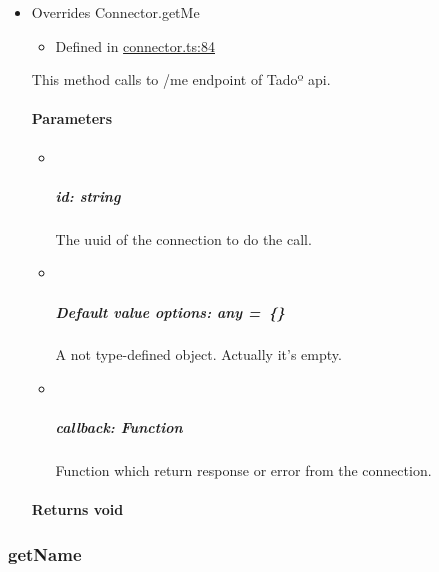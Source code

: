 \documentclass[]{article}
\providecommand{\tightlist}{%
  \setlength{\itemsep}{0pt}\setlength{\parskip}{0pt}}
\let\oldparagraph\paragraph
\renewcommand{\paragraph}[1]{\oldparagraph{#1}\mbox{}}
\let\oldsubparagraph\subparagraph
\renewcommand{\subparagraph}[1]{\oldsubparagraph{#1}\mbox{}}
\begin{document}
\begin{itemize}
\item
  Overrides Connector.getMe

  \begin{itemize}
  \tightlist
  \item
    Defined in
    \href{https://github.com/BFMBFramework/TadoConnector/blob/f05932b/src/connector.ts\#L84}{connector.ts:84}
  \end{itemize}

  This method calls to /me endpoint of Tadoº api.

  \hypertarget{parameters-5}{%
  \paragraph{Parameters}\label{parameters-5}}

  \begin{itemize}
  \item ~
    \hypertarget{id-string-2}{%
    \subparagraph{\texorpdfstring{id:
    {string}}{id: string}}\label{id-string-2}}

    The uuid of the connection to do the call.
  \item ~
    \hypertarget{default-value-options-any}{%
    \subparagraph{\texorpdfstring{{Default value} options: {any}{
    =~\{\}}}{Default value options: any =~\{\}}}\label{default-value-options-any}}

    A not type-defined object. Actually it's empty.
  \item ~
    \hypertarget{callback-function-3}{%
    \subparagraph{\texorpdfstring{callback:
    {Function}}{callback: Function}}\label{callback-function-3}}

    Function which return response or error from the connection.
  \end{itemize}

  \hypertarget{returns-void-3}{%
  \paragraph{\texorpdfstring{Returns
  {void}}{Returns void}}\label{returns-void-3}}
\end{itemize}

\protect\hypertarget{getname}{}{}

\hypertarget{getname}{%
\subsubsection{getName}\label{getname}}
\end{document}
